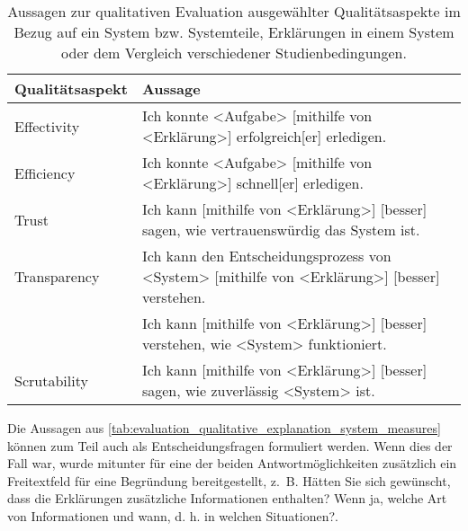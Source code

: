 \begin{table}[htb!]
    \begin{center}
        \begin{tabular}{|p{} p{}|}
            \hline
            \textbf{Qualitätsaspekt} & \textbf{Aussage} \\
            \hline
            \hline
            Effectivity     & Ich konnte <Aufgabe> [mithilfe von <Erklärung>] erfolgreich[er] erledigen.
                                \cite[vgl.][]{balog_measuring_2020, hernandez-bocanegra_effects_2020} \\
            \hline
            Efficiency      & Ich konnte <Aufgabe> [mithilfe von <Erklärung>] schnell[er] erledigen.
                                \cite[vgl.][]{balog_measuring_2020, hernandez-bocanegra_effects_2020} \\
            \hline
            Trust           & Ich kann [mithilfe von <Erklärung>] [besser] sagen, wie vertrauenswürdig das System ist.
                                \cite[vgl.][]{hoffman_metrics_nodate, balog_measuring_2020, weitz_you_2019, hernandez-bocanegra_effects_2020} \\
            \hline
            Transparency    & Ich kann den Entscheidungsprozess von <System> [mithilfe von <Erklärung>] [besser]
                                verstehen.
                                \cite[vgl.][]{wang_is_2018, balog_measuring_2020} \\
                            & Ich kann [mithilfe von <Erklärung>] [besser] verstehen, wie <System> funktioniert.
                                \cite[vgl.][]{riveiro_thats_2021, hoffman_metrics_nodate, hernandez-bocanegra_effects_2020} \\
            \hline
            Scrutability    &  Ich kann [mithilfe von <Erklärung>] [besser] sagen, wie zuverlässig <System> ist.
                                \cite[vgl.][]{hoffman_metrics_nodate, balog_measuring_2020} \\
            \hline
        \end{tabular}
    \end{center}
    \caption{Aussagen zur qualitativen Evaluation ausgewählter Qualitätsaspekte im Bezug auf ein System bzw. Systemteile, Erklärungen in einem System oder dem Vergleich verschiedener Studienbedingungen.}
    \label{tab:evaluation_qualitative_explanation_system_measures}
\end{table}

Die Aussagen aus \autoref{tab:evaluation_qualitative_explanation_system_measures} können zum Teil auch als Entscheidungsfragen formuliert werden. Wenn dies der Fall war, wurde mitunter für eine der beiden Antwortmöglichkeiten zusätzlich ein Freitextfeld für eine Begründung bereitgestellt, z.~B. \glqq Hätten Sie sich gewünscht, dass die Erklärungen zusätzliche Informationen enthalten? Wenn ja, welche Art von Informationen und wann, d. h. in welchen Situationen?\grqq \cite[übersetzt vgl.][]{riveiro_thats_2021}.

